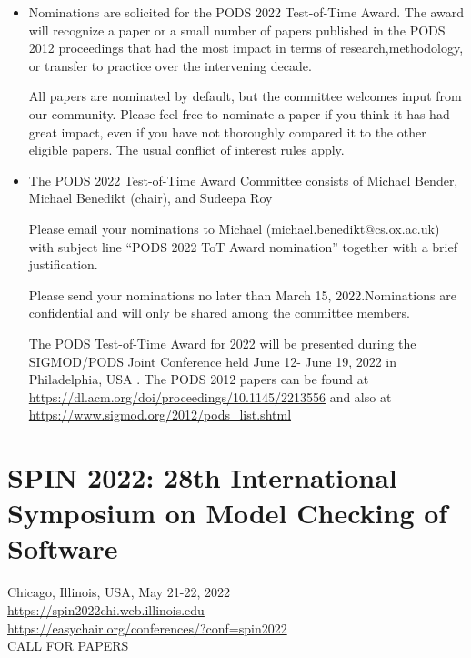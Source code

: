\documentclass[prodmode,acmtecs]{acmsmall} %
\begin{document}
\begin{itemize}\item  Nominations are solicited for the PODS 2022 Test-of-Time Award. The award will recognize a paper or a small number of papers published in the PODS 2012 proceedings that had the most impact in terms of research,methodology, or transfer to practice over the intervening decade. 
 
  All papers are nominated by default, but the committee welcomes input from our community. Please feel free to nominate a paper if you think it has had great impact, even if you have not thoroughly compared it to the other eligible papers. The usual conflict of interest rules apply. 
 
\item  The PODS 2022 Test-of-Time Award Committee consists of Michael Bender, Michael Benedikt (chair), and Sudeepa Roy 
 
  Please email your nominations to Michael (michael.benedikt@cs.ox.ac.uk) with subject line ``PODS 2022 ToT Award nomination'' together with a brief justification.  
 
  Please send your nominations no later than March 15, 2022.Nominations are confidential and will only be shared among the committee members. 
 
  The PODS Test-of-Time Award for 2022 will be presented during the SIGMOD/PODS Joint Conference held June 12- June 19, 2022 in Philadelphia, USA . The PODS 2012 papers can be found at \href{https://dl.acm.org/doi/proceedings/10.1145/2213556}{https://dl.acm.org/doi/proceedings/10.1145/2213556} and also at \href{https://www.sigmod.org/2012/pods_list.shtml}{https://www.sigmod.org/2012/pods\_list.shtml} 
 
\end{itemize}\section{SPIN 2022:  28th International Symposium on Model Checking of Software}\label{SPIN2022}  Chicago, Illinois, USA, May 21-22, 2022\\ 
  \href{https://spin2022chi.web.illinois.edu}{https://spin2022chi.web.illinois.edu}\\ 
  \href{https://easychair.org/conferences/?conf=spin2022}{https://easychair.org/conferences/?conf=spin2022}\\ 
CALL FOR PAPERS 
\end{document}
